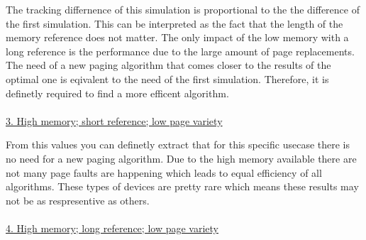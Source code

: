 \documentclass[12pt, reqno]{amsart}
\numberwithin{equation}{section}
\begin{document}
The tracking differnence of this simulation is proportional to the the difference of the first simulation. This can be interpreted as the fact that
the length of the memory reference does not matter. The only impact of the low memory with a long reference is the performance due to the large amount
of page replacements. The need of a new paging algorithm that comes closer to the results of the optimal one is eqivalent to the need of the first simulation. 
Therefore, it is definetly required to find a more efficent algorithm. \\ \\

\underline{3. High memory; short reference; low page variety} \\
\begin{center}
\end{center}

From this values you can definetly extract that for this specific usecase there is no need for a new paging algorithm. Due to the high memory available 
there are not many page faults are happening which leads to equal efficiency of all algorithms. These types of devices are pretty rare which means these results 
may not be as respresentive as others. \\ \\

\underline{4. High memory; long reference; low page variety} \\
\begin{center}
\end{center}
\end{document}
